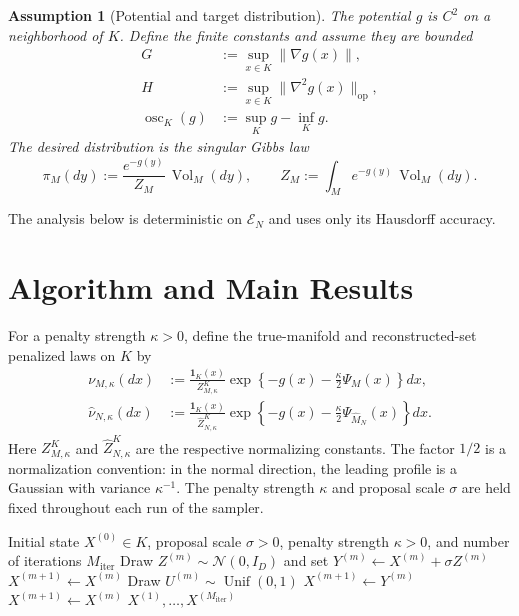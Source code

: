\documentclass{article}
\newtheorem{assumption}{Assumption}
\newcommand{\Vol}{\operatorname{Vol}}
\newcommand{\osc}{\operatorname{osc}}
\newcommand{\cE}{\mathcal E}
\newcommand{\wideM}{\widehat M_N}
\newcommand{\whatnu}{\widehat\nu_{N,\kappa}}
\numberwithin{equation}{section}
\begin{document}
\begin{assumption}[Potential and target distribution]
\label{ass:potential-target}
The potential $g$ is $C^2$ on a neighborhood of $K$. Define the finite
constants and assume they are bounded
\begin{align}
 G&:=\sup_{x\in K}\lVert\nabla g(x)\rVert,\label{eq:G-def}\\
 H&:=\sup_{x\in K}\lVert\nabla^2g(x)\rVert_{\mathrm{op}},\label{eq:H-def}\\
 \osc_K(g)&:=\sup_Kg-\inf_Kg.\label{eq:osc-def}
\end{align}
The desired distribution is the singular Gibbs law
\begin{equation}
  \pi_M(dy)
  :=\frac{e^{-g(y)}}{Z_M}\,\Vol_M(dy),
  \qquad
  Z_M:=\int_Me^{-g(y)}\,\Vol_M(dy).
\label{eq:true-target}
\end{equation}
\end{assumption}
The analysis below is deterministic on $\cE_N$ and uses only its Hausdorff
accuracy.


\section{Algorithm and Main Results}


For a penalty strength
$\kappa>0$, define the true-manifold and
reconstructed-set penalized laws on $K$ by
\begin{align}
 \nu_{M,\kappa}(dx)
 &:=\frac{\mathbf 1_K(x)}{Z_{M,\kappa}^{K}}
   \exp\left\{-g(x)-\frac\kappa2\Psi_M(x)\right\}dx,
\label{eq:true-penalized}\\
 \whatnu(dx)
 &:=\frac{\mathbf 1_K(x)}{\widehat Z_{N,\kappa}^{K}}
   \exp\left\{-g(x)-\frac\kappa2\Psi_{\wideM}(x)\right\}dx.
\label{eq:estimated-penalized}
\end{align}
Here $Z_{M,\kappa}^{K}$ and $\widehat Z_{N,\kappa}^{K}$ are the respective
normalizing constants.
The factor $1/2$ is a normalization convention: in the normal direction,
the leading profile is a Gaussian with variance $\kappa^{-1}$.
The penalty strength $\kappa$ and proposal scale $\sigma$ are held fixed
throughout each run of the sampler.

\begin{algorithm}[!ht]
\caption{Gaussian RMWH Using the Reconstructed Constraint Set}
\label{alg:rwmh}
\begin{algorithmic}[1]
\Require Initial state $X^{(0)}\in K$, proposal scale $\sigma>0$,
penalty strength $\kappa>0$, and number of iterations $M_{\mathrm{iter}}$
  \State Draw $Z^{(m)}\sim\mathcal N(0,I_D)$ and set
  $Y^{(m)}\gets X^{(m)}+\sigma Z^{(m)}$
    \State $X^{(m+1)}\gets X^{(m)}$
  \Else
    \State Draw $U^{(m)}\sim\operatorname{Unif}(0,1)$
      \State $X^{(m+1)}\gets Y^{(m)}$
    \Else
      \State $X^{(m+1)}\gets X^{(m)}$
    \EndIf
  \EndIf
\EndFor
\State \Return $X^{(1)},\ldots,X^{(M_{\mathrm{iter}})}$
\end{algorithmic}
\end{algorithm}
\end{document}
